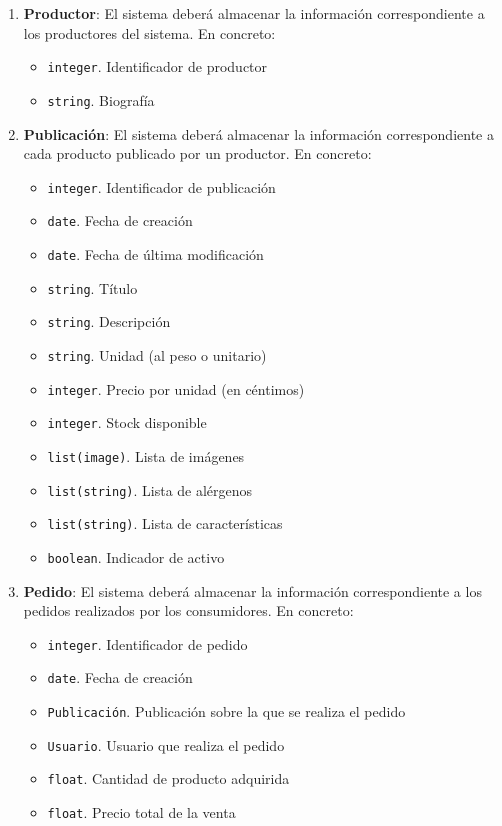 \begin{enumerate}[label=IRQ-\protect\twodigits{\arabic*}:, align=left, leftmargin=*]
    \item \textbf{Productor}: El sistema deberá almacenar la información correspondiente a los productores del sistema. En concreto:
    \begin{itemize}
		\item \texttt{integer}. Identificador de productor
        \item \texttt{string}. Biografía
    \end{itemize}
    
    \item \textbf{Publicación}: El sistema deberá almacenar la información correspondiente a cada producto publicado por un productor. En concreto:
    \begin{itemize}
        \item \texttt{integer}. Identificador de publicación
        \item \texttt{date}. Fecha de creación
        \item \texttt{date}. Fecha de última modificación
        \item \texttt{string}. Título
        \item \texttt{string}. Descripción
        \item \texttt{string}. Unidad (al peso o unitario)
        \item \texttt{integer}. Precio por unidad (en céntimos)
        \item \texttt{integer}. Stock disponible
        \item \texttt{list(image)}. Lista de imágenes
        \item \texttt{list(string)}. Lista de alérgenos
        \item \texttt{list(string)}. Lista de características
        \item \texttt{boolean}. Indicador de activo
    \end{itemize}

    \item \textbf{Pedido}: El sistema deberá almacenar la información correspondiente a los pedidos realizados por los consumidores. En concreto:
    \begin{itemize}
        \item \texttt{integer}. Identificador de pedido
        \item \texttt{date}. Fecha de creación
        \item \texttt{Publicación}. Publicación sobre la que se realiza el pedido
        \item \texttt{Usuario}. Usuario que realiza el pedido
        \item \texttt{float}. Cantidad de producto adquirida
        \item \texttt{float}. Precio total de la venta
    \end{itemize}


\end{enumerate}
